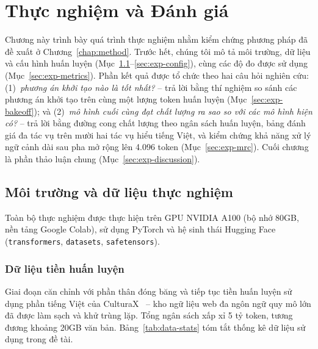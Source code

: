 \chapter{Thực nghiệm và Đánh giá}
\label{chap:experiment}

Chương này trình bày quá trình thực nghiệm nhằm kiểm chứng phương pháp đã đề xuất ở
Chương~\ref{chap:method}. Trước hết, chúng tôi mô tả môi trường, dữ liệu và cấu hình huấn
luyện (Mục~\ref{sec:exp-setup}--\ref{sec:exp-config}), cùng các độ đo được sử dụng
(Mục~\ref{sec:exp-metrics}). Phần kết quả được tổ chức theo hai câu hỏi nghiên cứu:
(1)~\textit{phương án khởi tạo nào là tốt nhất?} -- trả lời bằng thí nghiệm so sánh các
phương án khởi tạo trên cùng một lượng token huấn luyện (Mục~\ref{sec:exp-bakeoff}); và
(2)~\textit{mô hình cuối cùng đạt chất lượng ra sao so với các mô hình hiện có?} -- trả lời
bằng đường cong chất lượng theo ngân sách huấn luyện, bảng đánh giá đa tác vụ trên mười hai
tác vụ hiểu tiếng Việt, và kiểm chứng khả năng xử lý ngữ cảnh dài sau pha mở rộng lên 4.096 token
(Mục~\ref{sec:exp-mrc}). Cuối chương là phần thảo luận chung
(Mục~\ref{sec:exp-discussion}).

\section{Môi trường và dữ liệu thực nghiệm}
\label{sec:exp-setup}

Toàn bộ thực nghiệm được thực hiện trên GPU NVIDIA A100 (bộ nhớ 80GB, nền tảng Google
Colab), sử dụng PyTorch và hệ sinh thái Hugging Face (\texttt{transformers},
\texttt{datasets}, \texttt{safetensors}).

\subsection{Dữ liệu tiền huấn luyện}
\label{subsec:exp-cpt-data}

Giai đoạn căn chỉnh với phần thân đóng băng và tiếp tục tiền huấn luyện sử dụng phần tiếng Việt của
CulturaX~\cite{nguyen2023culturax} -- kho ngữ liệu web đa ngôn ngữ quy mô lớn đã được làm sạch
và khử trùng lặp. Tổng ngân sách xấp xỉ 5 tỷ token, tương đương khoảng 20GB văn bản.
Bảng~\ref{tab:data-stats} tóm tắt thống kê dữ liệu sử dụng trong đề tài.

